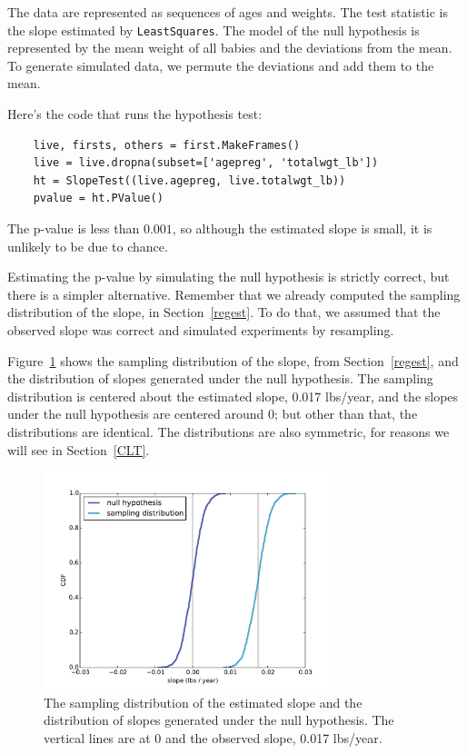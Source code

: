 \documentclass[12pt]{book}
\begin{document}
The data are represented as sequences of ages and weights.  The
test statistic is the slope estimated by {\tt LeastSquares}.
The model of the null hypothesis is represented by the mean weight
of all babies and the deviations from the mean.  To
generate simulated data, we permute the deviations and add them to
the mean.

Here's the code that runs the hypothesis test:

\begin{verbatim}
    live, firsts, others = first.MakeFrames()
    live = live.dropna(subset=['agepreg', 'totalwgt_lb'])
    ht = SlopeTest((live.agepreg, live.totalwgt_lb))
    pvalue = ht.PValue()
\end{verbatim}

The p-value is less than $0.001$, so although the estimated
slope is small, it is unlikely to be due to chance.

Estimating the p-value by simulating the null hypothesis is strictly
correct, but there is a simpler alternative.  Remember that we already
computed the sampling distribution of the slope, in
Section~\ref{regest}.  To do that, we assumed that the observed slope
was correct and simulated experiments by resampling.

Figure~\ref{linear4} shows the sampling distribution of the
slope, from Section~\ref{regest}, and the distribution of slopes
generated under the null hypothesis.  The sampling distribution
is centered about the estimated slope, 0.017 lbs/year, and the slopes
under the null hypothesis are centered around 0; but other than
that, the distributions are identical.  The distributions are
also symmetric, for reasons we will see in Section~\ref{CLT}.

\begin{figure}
\centerline{\includegraphics[height=2.5in]{figs/linear4.pdf}}
\caption{The sampling distribution of the estimated
slope and the distribution of slopes
generated under the null hypothesis.  The vertical lines are at 0
and the observed slope, 0.017 lbs/year.}
\label{linear4}
\end{figure}
\end{document}
